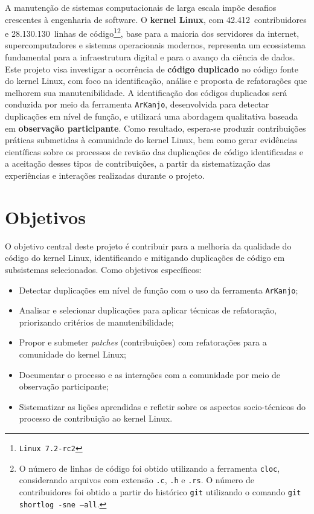 \documentclass[twocolumn]{article}
\def\kernelauthor{42.412}
\def\kernelloc{28.130.130}
\begin{document}
A manutenção de sistemas computacionais de larga escala impõe desafios crescentes à engenharia de software. O \textbf{kernel Linux}, com \kernelauthor~contribuidores e \kernelloc~linhas de código\footnote{\texttt{Linux 7.2-rc2}}\footnote{O número de linhas de código foi obtido utilizando a ferramenta \texttt{cloc}, considerando arquivos com extensão \texttt{.c}, \texttt{.h} e \texttt{.rs}. O número de contribuidores foi obtido a partir do histórico \texttt{git} utilizando o comando \texttt{git shortlog -sne --all}.}, base para a maioria dos servidores da internet, supercomputadores e sistemas operacionais modernos\cite{Corbet2017}, representa um ecossistema fundamental para a infraestrutura digital e para o avanço da ciência de dados. Este projeto visa investigar a ocorrência de \textbf{código duplicado} no código fonte do kernel Linux, com foco na identificação, análise e proposta de refatorações que melhorem sua manutenibilidade\cite{Alves2013}. A identificação dos códigos duplicados será conduzida por meio da ferramenta \texttt{ArKanjo}\cite{arcanjo2025arkanjo}, desenvolvida para detectar duplicações em nível de função, e utilizará uma abordagem qualitativa baseada em \textbf{observação participante}\cite{Seaman2008,Robson2016,Wen2021}. Como resultado, espera-se produzir contribuições práticas submetidas à comunidade do kernel Linux, bem como gerar evidências científicas sobre os processos de revisão das duplicações de código identificadas e a aceitação desses tipos de contribuições, a partir da sistematização das experiências e interações realizadas durante o projeto.

\section{Objetivos}

O objetivo central deste projeto é contribuir para a melhoria da qualidade do código do kernel Linux, identificando e mitigando duplicações de código em subsistemas selecionados. Como objetivos específicos:

\begin{itemize}
    \item Detectar duplicações em nível de função com o uso da ferramenta \texttt{ArKanjo};

    \item Analisar e selecionar duplicações para aplicar técnicas de refatoração, priorizando critérios de manutenibilidade;

    \item Propor e submeter \textit{patches} (contribuições) com refatorações para a comunidade do kernel Linux;

    \item Documentar o processo e as interações com a comunidade por meio de observação participante;

    \item Sistematizar as lições aprendidas e refletir sobre os aspectos socio-técnicos do processo de contribuição ao kernel Linux.
\end{itemize}
\end{document}
